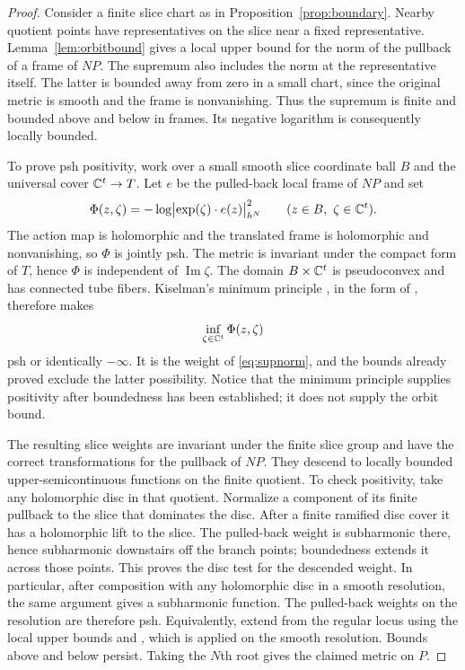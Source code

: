 \begin{proof}
Consider a finite slice chart as in Proposition~\ref{prop:boundary}. Nearby quotient points have representatives on the slice near a fixed representative. Lemma~\ref{lem:orbitbound} gives a local upper bound for the norm of the pullback of a frame of $NP$. The supremum also includes the norm at the representative itself. The latter is bounded away from zero in a small chart, since the original metric is smooth and the frame is nonvanishing. Thus the supremum is finite and bounded above and below in frames. Its negative logarithm is consequently locally bounded.

To prove psh positivity, work over a small smooth slice coordinate ball $B$ and the universal cover $\mathbb C^t\to T$. Let $e$ be the pulled-back local frame of $NP$ and set
\[
\Phi(z,\zeta)=-\log\bigl|\exp(\zeta)\cdot e(z)\bigr|_{h^N}^2
\qquad(z\in B,\ \zeta\in\mathbb C^t).
\]
The action map is holomorphic and the translated frame is holomorphic and nonvanishing, so $\Phi$ is jointly psh. The metric is invariant under the compact form of $T$, hence $\Phi$ is independent of $\operatorname{Im}\zeta$. The domain $B\times\mathbb C^t$ is pseudoconvex and has connected tube fibers. Kiselman's minimum principle \cite{Kiselman1978}, in the form of \cite[Theorem~1.1]{DWZZ2018}, therefore makes
\[
\inf_{\zeta\in\mathbb C^t}\Phi(z,\zeta)
\]
psh or identically $-\infty$. It is the weight of \eqref{eq:supnorm}, and the bounds already proved exclude the latter possibility. Notice that the minimum principle supplies positivity after boundedness has been established; it does not supply the orbit bound.

The resulting slice weights are invariant under the finite slice group and have the correct transformations for the pullback of $NP$. They descend to locally bounded upper-semicontinuous functions on the finite quotient. To check positivity, take any holomorphic disc in that quotient. Normalize a component of its finite pullback to the slice that dominates the disc. After a finite ramified disc cover it has a holomorphic lift to the slice. The pulled-back weight is subharmonic there, hence subharmonic downstairs off the branch points; boundedness extends it across those points. This proves the disc test for the descended weight. In particular, after composition with any holomorphic disc in a smooth resolution, the same argument gives a subharmonic function. The pulled-back weights on the resolution are therefore psh. Equivalently, extend from the regular locus using the local upper bounds and \cite[Chapter~I, Theorem~5.24]{Demailly2012}, which is applied on the smooth resolution. Bounds above and below persist. Taking the $N$th root gives the claimed metric on $P$.


\end{proof}
